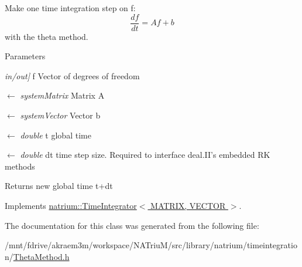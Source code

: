 Make one time integration step on f: \[ \frac{df}{dt} = Af+b \] with the theta method. 
\begin{DoxyParams}{Parameters}
\item[{\em in/out\mbox{]}}]f Vector of degrees of freedom \item[\mbox{$\leftarrow$} {\em systemMatrix}]Matrix A \item[\mbox{$\leftarrow$} {\em systemVector}]Vector b \item[\mbox{$\leftarrow$} {\em double}]t global time \item[\mbox{$\leftarrow$} {\em double}]dt time step size. Required to interface deal.II's embedded RK methods \end{DoxyParams}
\begin{DoxyReturn}{Returns}
new global time t+dt 
\end{DoxyReturn}


Implements \hyperlink{classnatrium_1_1TimeIntegrator_a0237ebbaf737c7d3278777fb08007e99}{natrium::TimeIntegrator$<$ MATRIX, VECTOR $>$}.

The documentation for this class was generated from the following file:\begin{DoxyCompactItemize}
\item 
/mnt/fdrive/akraem3m/workspace/NATriuM/src/library/natrium/timeintegration/\hyperlink{ThetaMethod_8h}{ThetaMethod.h}\end{DoxyCompactItemize}
